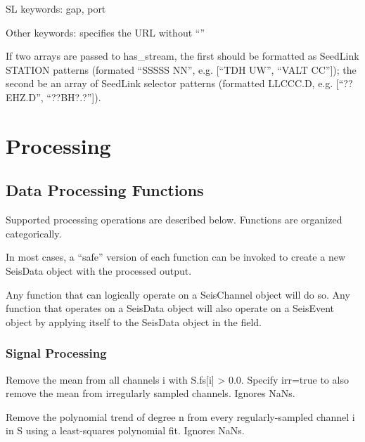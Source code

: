 \documentclass[letterpaper,11pt,english]{sphinxmanual}
\begin{document}
\begin{DUlineblock}{0em}
\item[] SL keywords: gap, port
\item[] Other keywords:  specifies the URL without “”
\end{DUlineblock}

If two arrays are passed to has\_stream, the first should be
formatted as SeedLink STATION patterns (formated “SSSSS NN”, e.g.
{[}“TDH UW”, “VALT CC”{]}); the second be an array of SeedLink selector
patterns (formatted LLCCC.D, e.g. {[}“??EHZ.D”, “??BH?.?”{]}).


\chapter{Processing}
\label{\detokenize{index:processing}}

\section{Data Processing Functions}
\label{\detokenize{src/Processing/processing:data-processing-functions}}\label{\detokenize{src/Processing/processing::doc}}
Supported processing operations are described below. Functions are organized
categorically.

In most cases, a “safe” version of each function can be invoked to create a
new SeisData object with the processed output.

Any function that can logically operate on a SeisChannel object will do so. Any
function that operates on a SeisData object will also operate on a SeisEvent
object by applying itself to the SeisData object in the  field.


\subsection{Signal Processing}
\label{\detokenize{src/Processing/processing:signal-processing}}
Remove the mean from all channels i with S.fs{[}i{]} \textgreater{} 0.0. Specify irr=true to also
remove the mean from irregularly sampled channels. Ignores NaNs.

Remove the polynomial trend of degree n from every regularly-sampled channel i
in S using a least-squares polynomial fit. Ignores NaNs.


\begin{fulllineitems}
\end{fulllineitems}
\end{document}
